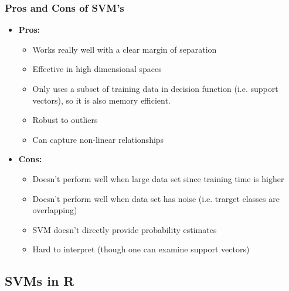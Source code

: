 \documentclass[11pt]{article}
\begin{document}
\subsubsection{Pros and Cons of SVM's}
\begin{itemize}
    \item \textbf{Pros:}
        \begin{itemize}
            \item Works really well with a clear margin of separation
            \item Effective in high dimensional spaces
            \item Only uses a subset of training data in decision function (i.e. support vectors), so it is also memory efficient.
            \item Robust to outliers
            \item Can capture non-linear relationships
        \end{itemize}
    \item \textbf{Cons:}
        \begin{itemize}
            \item Doesn't perform well when large data set since training time is higher
            \item Doesn't perform well when data set has noise (i.e. trarget classes are overlapping)
            \item SVM doesn't directly provide probability estimates
            \item Hard to interpret (though one can examine support vectors)
        \end{itemize}
\end{itemize}

\subsection{SVMs in R}
\end{document}
